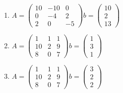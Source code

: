 \documentclass[conference,onecolumn]{IEEEtran}
\begin{document}
\begin{enumerate}[label=\arabic{enumi}.]
          \begin{enumerate}
              \centering
              \item $A =
                        \begin{pmatrix}
                            10 & -10 & 0  \\
                            0  & -4  & 2  \\
                            2  & 0   & -5
                        \end{pmatrix}
                        b =
                        \begin{pmatrix}
                            10 \\
                            2  \\
                            13
                        \end{pmatrix}
                    $
              \item $A =
                        \begin{pmatrix}
                            1  & 1 & 1 \\
                            10 & 2 & 9 \\
                            8  & 0 & 7
                        \end{pmatrix}
                        b =
                        \begin{pmatrix}
                            1 \\
                            3 \\
                            1
                        \end{pmatrix}
                    $
              \item $A =
                        \begin{pmatrix}
                            1  & 1 & 1 \\
                            10 & 2 & 9 \\
                            8  & 0 & 7
                        \end{pmatrix}
                        b =
                        \begin{pmatrix}
                            3 \\
                            2 \\
                            2
                        \end{pmatrix}
                    $
          \end{enumerate}


\end{enumerate}
\end{document}
